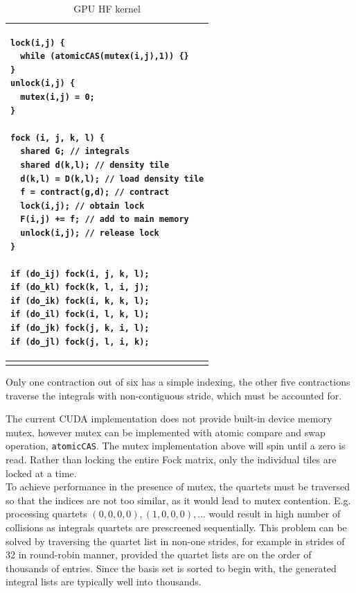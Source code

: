 \documentclass[12pt]{article}
\begin{document}
\begin{table}
\begin{tabular}{ p{6in} }
\hline
\begin{verbatim}
lock(i,j) {
  while (atomicCAS(mutex(i,j),1)) {}
}
unlock(i,j) {
  mutex(i,j) = 0;
}

fock (i, j, k, l) {
  shared G; // integrals
  shared d(k,l); // density tile
  d(k,l) = D(k,l); // load density tile
  f = contract(g,d); // contract
  lock(i,j); // obtain lock
  F(i,j) += f; // add to main memory
  unlock(i,j); // release lock
}

if (do_ij) fock(i, j, k, l);
if (do_kl) fock(k, l, i, j);
if (do_ik) fock(i, k, k, l);
if (do_il) fock(i, l, k, l);
if (do_jk) fock(j, k, i, l);
if (do_jl) fock(j, l, i, k);

\end{verbatim} \\
\hline

\label{gpu-fock}
\caption{GPU HF kernel}
\end{tabular}
\end{table}


Only one contraction out of six has a simple indexing,
the other five contractions traverse the integrals
with non-contiguous stride, which must be accounted for.

The current CUDA implementation does not provide built-in device
memory mutex, however mutex can be implemented with atomic compare and
swap operation, {\tt atomicCAS}.  The mutex implementation above will
spin until a zero is read.  Rather than locking the entire Fock
matrix, only the individual tiles are locked at a time. \\

To achieve performance in the presence of mutex, the quartets must be
traversed so that the indices are not too similar, as it would lead to
mutex contention.  E.g. processing quartets $(0,0,0,0), (1,0,0,0),
...$ would result in high number of collisions as integrals quartets
are prescreened sequentially.  This problem can be solved by
traversing the quartet list in non-one strides, for example in strides
of 32 in round-robin manner, provided the quartet lists are on the
order of thousands of entries.  Since the basis set is sorted to begin
with, the generated integral lists are typically well into thousands.
\end{document}
